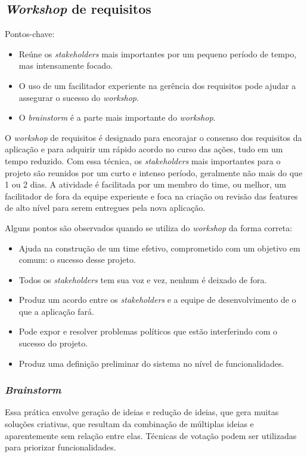     \subsection{\textit{Workshop} de requisitos}
    
      Pontos-chave:
      \begin{itemize}
       \item Reúne os \textit{stakeholders} mais importantes por um pequeno período de tempo, mas intensamente focado.
       \item O uso de um facilitador experiente na gerência dos requisitos pode ajudar a assegurar o sucesso do \textit{workshop}.
       \item O \textit{brainstorm} é a parte mais importante do \textit{workshop}.
      \end{itemize}
      
      O \textit{workshop} de requisitos é designado para encorajar o consenso dos requisitos da aplicação 
      e para adquirir um rápido acordo no curso das ações, 
      tudo em um tempo reduzido. Com essa técnica, os \textit{stakeholders} mais importantes para o projeto são 
      reunidos por um curto e intenso período, geralmente não mais do que 1 ou 2 dias. 
      A atividade é facilitada por um membro do time, ou melhor, 
      um facilitador de fora da equipe experiente e foca na criação ou revisão das features de alto nível 
      para serem entregues pela nova aplicação.
      
      Alguns pontos são observados quando se utiliza do \textit{workshop} da forma correta:
      \begin{itemize}
       \item Ajuda na construção de um time efetivo, comprometido com um objetivo em comum: o sucesso desse projeto.
       \item Todos os \textit{stakeholders} tem sua voz e vez, nenhum é deixado de fora.
       \item Produz um acordo entre os \textit{stakeholders} e a equipe de desenvolvimento de o que a aplicação fará.
       \item Pode expor e resolver problemas políticos que estão interferindo com o sucesso do projeto.
       \item Produz uma definição preliminar do sistema no nível de funcionalidades.
      \end{itemize}
      
      \subsubsection{\textit{Brainstorm}}
	
	Essa prática envolve geração de ideias e redução de ideias, que gera muitas soluções criativas, 
	que resultam da combinação de múltiplas ideias e aparentemente sem relação entre elas. 
	Técnicas de votação podem ser utilizadas para priorizar funcionalidades.      